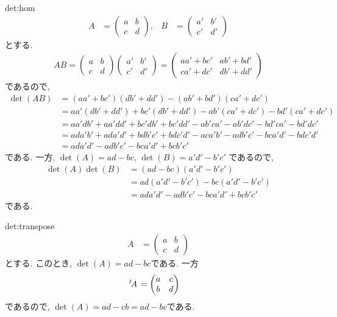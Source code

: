 \begin{proofof}{det:hom}
  \begin{align*}
    A&=
    \begin{pmatrix}
      a&b\\c&d
    \end{pmatrix},&
    B&=
    \begin{pmatrix}
      a'&b'\\c'&d'
    \end{pmatrix}
  \end{align*}
  とする.
  \begin{align*}
    AB=
    \begin{pmatrix}
      a&b\\c&d
    \end{pmatrix}
    \begin{pmatrix}
      a'&b'\\c'&d'
    \end{pmatrix}
    =
    \begin{pmatrix}
    aa'+bc'&ab'+bd'\\ca'+dc'&db'+dd'
    \end{pmatrix}
  \end{align*}
  であるので,
  \begin{align*}
    \det(AB)&=(aa'+bc')(db'+dd')-(ab'+bd')(ca'+dc')\\
    &=aa'(db'+dd')+bc'(db'+dd')-ab'(ca'+dc')-bd'(ca'+dc')\\
    &=aa'db'+aa'dd'+bc'db'+bc'dd'-ab'ca'-ab'dc'-bd'ca'-bd'dc'\\
    &=ada'b'+ada'd'+bdb'c'+bdc'd'-aca'b'-adb'c'-bca'd'-bdc'd'\\
    &=ada'd'-adb'c'-bca'd'+bcb'c'
  \end{align*}
  である.
  一方,
  $\det(A)=ad-bc$,
  $\det(B)=a'd'-b'c'$
  であるので,
  \begin{align*}
    \det(A)\det(B)&=(ad-bc)(a'd'-b'c')\\
    &=ad(a'd'-b'c')-bc(a'd'-b'c')\\
    &=ada'd'-adb'c'-bca'd'+bcb'c'
  \end{align*}
  である.
\end{proofof}

\begin{proofof}{det:transpose}
  \begin{align*}
    A&=
    \begin{pmatrix}
      a&b\\c&d
    \end{pmatrix}
  \end{align*}
  とする.
  このとき, $\det(A)=ad-bc$である.
  一方
  \begin{align*}
    {\left.^{t}\!A\right.}&=
    \begin{pmatrix}
      a&c\\b&d
    \end{pmatrix}
  \end{align*}
  であるので,
  $\det(A)=ad-cb=ad-bc$である.
\end{proofof}

